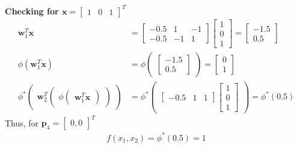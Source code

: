 \textbf{Checking for $\textbf{x} = \begin{bmatrix} 1 & 0 & 1 \end{bmatrix}^T$}
\begin{align*}
  \textbf{w}_1^T\textbf{x} &= \begin{bmatrix}
    -0.5 & 1 & -1 \\
    -0.5 & -1 & 1 
  \end{bmatrix} \begin{bmatrix}
    1\\
    0 \\
    1
  \end{bmatrix} = \begin{bmatrix}
    -1.5 \\
    0.5
  \end{bmatrix} \\
  \phi(\textbf{w}_1^T\textbf{x}) &= \phi\begin{pmatrix}
    \begin{bmatrix}
      -1.5 \\
      0.5
    \end{bmatrix}
  \end{pmatrix} = \begin{bmatrix}
    0 \\
    1
  \end{bmatrix} \\
  \phi^{*} \begin{pmatrix}
    \textbf{w}_2^T 
    \begin{pmatrix}
      \phi \begin{pmatrix}
        \textbf{w}_1^T\textbf{x}
    \end{pmatrix}  
  \end{pmatrix}
  \end{pmatrix} &= \phi^{*}\begin{pmatrix}
    \begin{bmatrix}
      -0.5 & 1 & 1
    \end{bmatrix} \begin{bmatrix}
      1 \\ 
      0 \\
      1
    \end{bmatrix}
  \end{pmatrix} = \phi^{*}(0.5)
\end{align*}
Thus, for $\textbf{p}_4 = \begin{bmatrix}
  0,0
\end{bmatrix}^T$
\begin{align*}
  f(x_1,x_2) = \phi^{*} (0.5) = 1
\end{align*}
